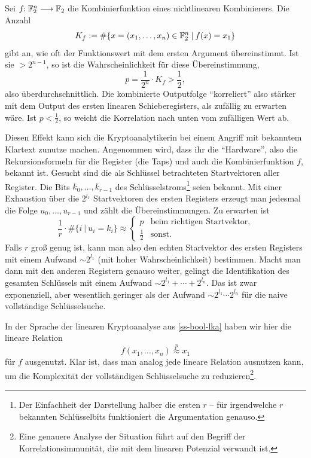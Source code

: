 \begin{refsegment}
Sei $f\!\!: \mathbb{F}_2^n \longrightarrow \mathbb{F}_2$ die Kombinierfunktion eines
nichtlinearen Kombinierers. Die Anzahl
\[
   K_f := \#\{ x = (x_1, \ldots, x_n) \in \mathbb{F}_2^n \:|\: f(x) = x_1 \}
\]
gibt an, wie oft der Funktionswert mit dem ersten Argument übereinstimmt.
Ist sie $> 2^{n-1}$, so ist die Wahrscheinlichkeit für diese Übereinstimmung,
\[
   p = \frac{1}{2^n} \cdot K_f > \frac{1}{2},
\]
also überdurchschnittlich. Die kombinierte Outputfolge "`korreliert"' also
stärker mit dem Output des ersten linearen Schieberegisters, als zufällig
zu erwarten wäre. Ist $p < \frac{1}{2}$, so weicht die Korrelation nach
unten vom zufälligen Wert ab.

Diesen Effekt kann sich die Kryptoanalytikerin bei einem Angriff mit
bekanntem Klartext
zunutze machen. Angenommen wird, dass ihr die
"`Hardware"', also die Rekursionsformeln für die Register (die Taps) und
auch die Kombinierfunktion $f$, bekannt ist. Gesucht sind die als Schlüssel
betrachteten Startvektoren aller Register. Die Bits $k_0, \ldots, k_{r-1}$
des Schlüsselstroms\footnote{%
  Der Einfachheit der Darstellung halber die ersten $r$ -- für irgendwelche $r$
  bekannten Schlüsselbits funktioniert die Argumentation genauso.
} seien bekannt. Mit einer Exhaustion über die $2^{l_1}$
Startvektoren des ersten Registers erzeugt man jedesmal die Folge
$u_0, \ldots, u_{r-1}$ und zählt die Übereinstimmungen. Zu erwarten ist
\[
   \frac{1}{r}\cdot \#\{i \:|\: u_i = k_i\} \approx
   \begin{cases}
      p & \text{beim richtigen Startvektor,} \\
      \frac{1}{2} & \text{sonst.}
   \end{cases}
\]
Falls $r$ groß genug ist, kann man also den echten Startvektor des ersten
Registers mit einem Aufwand $\sim 2^{l_1}$ (mit hoher Wahrscheinlichkeit)
bestimmen. Macht man dann mit
den anderen Registern genauso weiter, gelingt die Identifikation des
gesamten Schlüssels mit einem Aufwand $\sim 2^{l_1} + \cdots + 2^{l_n}$.
Das ist zwar exponenziell, aber wesentlich geringer als der Aufwand
$\sim 2^{l_1} \cdots 2^{l_n}$ für die naive vollständige Schlüsselsuche.

In der Sprache der linearen
Kryptoanalyse
aus \ref{ss-bool-lka} haben
wir hier die lineare Relation
\[
     f(x_1, \ldots, x_n) \stackrel{p}{\approx} x_1
\]
für $f$ ausgenutzt. Klar ist, dass man analog jede lineare
Relation ausnutzen kann, um die Komplexität der vollständigen Schlüsselsuche
zu reduzieren\footnote{%
  Eine genauere Analyse der Situation führt auf den Begriff der
  Korrelationsimmunität, die mit dem linearen
  Potenzial
  verwandt ist.
}.


\end{refsegment}
